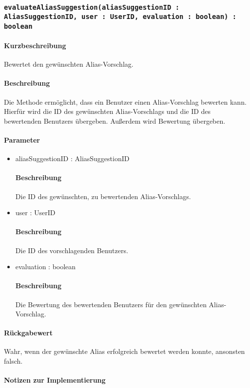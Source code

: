 \subsubsection{\texttt{evaluateAliasSuggestion(aliasSuggestionID : AliasSuggestionID, user : UserID, evaluation : boolean) : boolean}}%
\paragraph*{Kurzbeschreibung}
Bewertet den gewünschten Alias-Vorschlag.
\paragraph*{Beschreibung}
Die Methode ermöglicht, dass ein Benutzer einen Alias-Vorschlag bewerten kann. 
Hierfür wird die ID des gewünschten Alias-Vorschlags und die ID des bewertenden Benutzers übergeben.
Außerdem wird Bewertung übergeben.
\paragraph*{Parameter}
\begin{itemize}
	\item aliasSuggestionID : AliasSuggestionID
		\paragraph*{Beschreibung}
		Die ID des gewünschten, zu bewertenden Alias-Vorschlags.
	\item user : UserID
		\paragraph*{Beschreibung}
		Die ID des vorschlagenden Benutzers.
	\item evaluation : boolean
		\paragraph*{Beschreibung}
		Die Bewertung des bewertenden Benutzers für den gewünschten Alias-Vorschlag.
\end{itemize}
\paragraph*{Rückgabewert}
Wahr, wenn der gewünschte Alias erfolgreich bewertet werden konnte, ansonsten falsch.

\paragraph*{Notizen zur Implementierung}%
